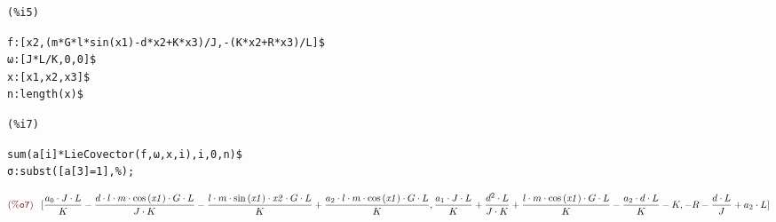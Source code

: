 \noindent
\begin{minipage}[t]{8ex}\color{red}\bf
\begin{verbatim}
(%i5) 
\end{verbatim}
\end{minipage}
\begin{minipage}[t]{\textwidth}\color{blue}
\begin{verbatim}
f:[x2,(m*G*l*sin(x1)-d*x2+K*x3)/J,-(K*x2+R*x3)/L]$
ω:[J*L/K,0,0]$
x:[x1,x2,x3]$
n:length(x)$
\end{verbatim}
\end{minipage}

\smallskip


\noindent
\begin{minipage}[t]{8ex}\color{red}\bf
\begin{verbatim}
(%i7) 
\end{verbatim}
\end{minipage}
\begin{minipage}[t]{\textwidth}\color{blue}
\begin{verbatim}
sum(a[i]*LieCovector(f,ω,x,i),i,0,n)$
σ:subst([a[3]=1],%);
\end{verbatim}
\end{minipage}

\noindent
$\displaystyle
\parbox{8ex}{$\color{labelcolor}\mathrm{\tt (\%o7) }\quad $}
[\frac{{{a}_{0}}\cdot J\cdot L}{K}-\frac{d\cdot l\cdot m\cdot \mathrm{cos}\left( \mathit{x1}\right) \cdot G\cdot L}{J\cdot K}-\frac{l\cdot m\cdot \mathrm{sin}\left( \mathit{x1}\right) \cdot \mathit{x2}\cdot G\cdot L}{K}+\frac{{{a}_{2}}\cdot l\cdot m\cdot \mathrm{cos}\left( \mathit{x1}\right) \cdot G\cdot L}{K},\frac{{{a}_{1}}\cdot J\cdot L}{K}+\frac{{{d}^{2}}\cdot L}{J\cdot K}+\frac{l\cdot m\cdot \mathrm{cos}\left( \mathit{x1}\right) \cdot G\cdot L}{K}-\frac{{{a}_{2}}\cdot d\cdot L}{K}-K,-R-\frac{d\cdot L}{J}+{{a}_{2}}\cdot L]\mbox{}
$
